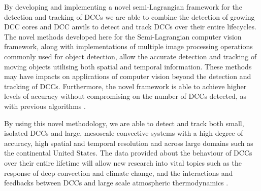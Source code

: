 By developing and implementing a novel semi-Lagrangian framework for the detection and tracking of DCCs we are able to combine the detection of growing DCC cores \citep{zinner_cb-tram:_2008} and DCC anvils \citep{muller_role_2018} to detect and track DCCs over their entire lifecycles.
The novel methods developed here for the Semi-Lagrangian computer vision framework, along with implementations of multiple image processing operations commonly used for object detection, allow the accurate detection and tracking of moving objects utilising both spatial and temporal information.
These methods may have impacts on applications of computer vision beyond the detection and tracking of DCCs.
Furthermore, the novel framework is able to achieve higher levels of accuracy without compromising on the number of DCCs detected, as with previous algorithms \citep{muller_novel_2019}.

By using this novel methodology, we are able to detect and track both small, isolated DCCs and large, mesoscale convective systems with a high degree of accuracy, high spatial and temporal resolution and across large domains such as the continental United States.
The data provided about the behaviour of DCCs over their entire lifetime will allow new research into vital topics such as the response of deep convection and climate change, and the interactions and feedbacks between DCCs and large scale atmospheric thermodynamics \citep{varble_erroneous_2018}.





